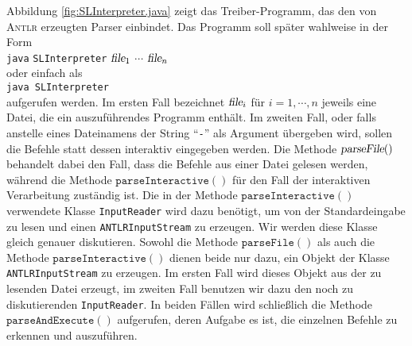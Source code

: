 Abbildung \ref{fig:SLInterpreter.java} zeigt das Treiber-Programm, das den von
\textsc{Antlr} erzeugten Parser einbindet.  Das Programm soll sp\"ater wahlweise in der Form
\\[0.2cm]
\hspace*{1.3cm}
\texttt{java} \texttt{SLInterpreter} $\textsl{file}_1$ $\cdots$ $\textsl{file}_n$
\\[0.2cm]
oder einfach als
\\[0.2cm]
\hspace*{1.3cm}
\texttt{java SLInterpreter}
\\[0.2cm]
aufgerufen werden.  Im ersten Fall  bezeichnet $\textsl{file}_i$ f\"ur $i=1,\cdots,n$
jeweils eine Datei, die ein auszuf\"uhrendes Programm enth\"alt.  Im zweiten Fall, oder
falls anstelle eines Dateinamens der String ``\texttt{-}'' als Argument \"ubergeben wird,
sollen die Befehle statt dessen interaktiv
eingegeben werden.  Die Methode $\textsl{parseFile}()$ behandelt dabei den Fall,
dass die Befehle aus einer Datei gelesen werden, w\"ahrend die Methode
$\texttt{parseInteractive}()$ f\"ur den Fall der interaktiven Verarbeitung zust\"andig ist.
Die in der Methode $\texttt{parseInteractive}()$ verwendete Klasse \texttt{InputReader} wird
dazu ben\"otigt, um von der Standardeingabe zu lesen und einen
\texttt{ANTLRInputStream} zu erzeugen.  Wir werden diese Klasse gleich genauer
diskutieren.  Sowohl die Methode $\texttt{parseFile}()$ als auch die Methode
$\texttt{parseInteractive}()$ dienen beide nur dazu, ein Objekt der Klasse
\texttt{ANTLRInputStream} zu erzeugen.  Im ersten Fall wird dieses Objekt aus der zu
lesenden Datei erzeugt, im zweiten Fall benutzen wir dazu den noch zu diskutierenden \texttt{InputReader}.
In beiden F\"allen wird schlie{\ss}lich die Methode $\texttt{parseAndExecute}()$ aufgerufen,
deren Aufgabe es ist, die einzelnen Befehle zu erkennen und auszuf\"uhren.


